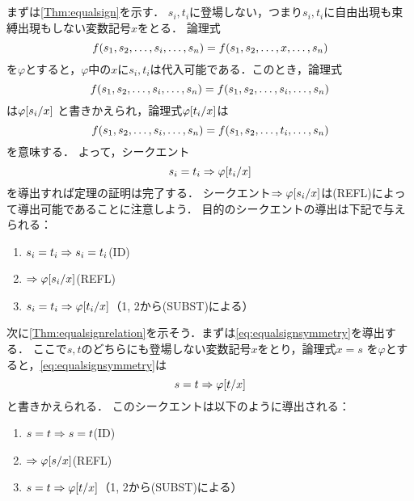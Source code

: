 \subsection*{}

まずは\cref{Thm:equalsign}を示す．
\(s_i, t_i\)に登場しない，つまり\(s_i, t_i\)に自由出現も束縛出現もしない変数記号\(x\)をとる．
論理式
\begin{equation*}
	\apply{f}{s_1, s_2, \dots, s_i, \dots, s_n} = \apply{f}{s_1, s_2, \dots, x, \dots, s_n}
\end{equation*}
を\(\varphi\)とすると，\(\varphi\)中の\(x\)に\(s_i, t_i\)は代入可能である．このとき，論理式
\begin{equation*}
	\apply{f}{s_1, s_2, \dots, s_i, \dots, s_n} = \apply{f}{s_1, s_2, \dots, s_i, \dots, s_n}
\end{equation*}
は\(\subst{\varphi}{s_i /x}\)
と書きかえられ，論理式\(\subst{\varphi}{t_i / x}\)は
\begin{equation*}
	\apply{f}{s_1, s_2, \dots, s_i, \dots, s_n} = \apply{f}{s_1, s_2, \dots, t_i, \dots, s_n}
\end{equation*}
を意味する．
よって，シークエント
\begin{equation*}
	s_i = t_i \sequent \subst{\varphi}{t_i / x}
\end{equation*}
を導出すれば定理の証明は完了する．
シークエント\(\sequent \subst{\varphi}{s_i / x}\)は(REFL)によって導出可能であることに注意しよう．
目的のシークエントの導出は下記で与えられる：
\begin{enumerate}
	\item \(s_i = t_i \Rightarrow s_i = t_i\)\quad (ID)
	\item \(\sequent \subst{\varphi}{s_i / x}\)\quad (REFL)
	\item \(s_i = t_i \sequent \subst{\varphi}{t_i / x}\)\quad （1, 2から(SUBST)による）
\end{enumerate}

次に\cref{Thm:equalsignrelation}を示そう．まずは\cref{eq:equalsignsymmetry}を導出する．
ここで\(s, t\)のどちらにも登場しない変数記号\(x\)をとり，論理式\(x = s\)
を\(\varphi\)とすると，\cref{eq:equalsignsymmetry}は
\begin{equation*}
	s = t \sequent \subst{\varphi}{t / x}
\end{equation*}
と書きかえられる．
このシークエントは以下のように導出される：
\begin{enumerate}
	\item \(s = t \Rightarrow s = t\)\quad (ID)
	\item \(\sequent \subst{\varphi}{s/x}\)\quad (REFL)
	\item \(s = t \sequent \subst{\varphi}{t/x}\)\quad （1, 2から(SUBST)による）
\end{enumerate}

